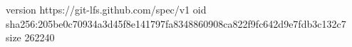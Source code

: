 version https://git-lfs.github.com/spec/v1
oid sha256:205be0c70934a3d45f8e141797fa8348860908ca822f9fc642d9e7fdb3c132c7
size 262240
